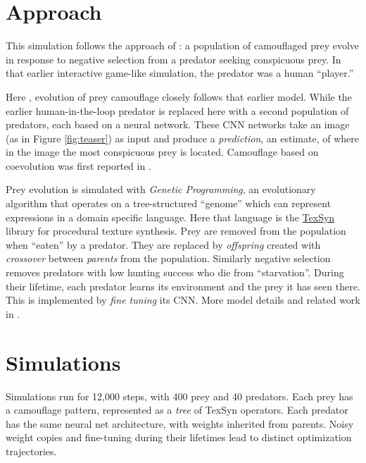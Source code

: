 \documentclass[sigconf]{acmart}
\newcommand{\jargon}[1]{\textit{#1}}
\begin{document}

\section{Approach}

This simulation follows the approach of \citet{reynolds_iec_2011}: a population of camouflaged prey evolve in response to negative selection from a predator seeking conspicuous prey. In that earlier interactive game-like simulation, the predator was a human “player.” 
\par
Here \cite{reynolds_coevolution_2023}, evolution of prey camouflage closely follows that earlier model. While the earlier human-in-the-loop predator is replaced here with a second population of predators, each based on a neural network. These CNN networks take an image (as in Figure \ref{fig:teaser}) as input and produce a \jargon{prediction}, an estimate, of where in the image the most conspicuous prey is located. Camouflage based on coevolution was first reported in \citet{harrington_coevolution_2014}.
\par
Prey evolution is simulated with \jargon{Genetic Programming}, an evolutionary algorithm that operates on a tree-structured “genome” which can represent expressions in a domain specific language. Here that language is the \href{https://github.com/cwreynolds/TexSyn}{TexSyn} library for procedural texture synthesis. Prey are removed from the population when “eaten” by a predator. They are replaced by \jargon{offspring} created with \jargon{crossover} between \jargon{parents} from the population. Similarly negative selection removes predators with low hunting success who die from “starvation”. During their lifetime, each predator learns its environment and the prey it has seen there. This is implemented by \jargon{fine tuning} its CNN. More model details and related work in \citet{reynolds_coevolution_2023}.
\par


\section{Simulations}

Simulations run for 12,000 steps, with 400 prey and 40 predators.  Each prey has a camouflage pattern, represented as a \jargon{tree} of TexSyn operators. Each predator has the same neural net architecture, with weights inherited from parents. Noisy weight copies and fine-tuning during their lifetimes lead to distinct optimization trajectories.
\par
\end{document}
